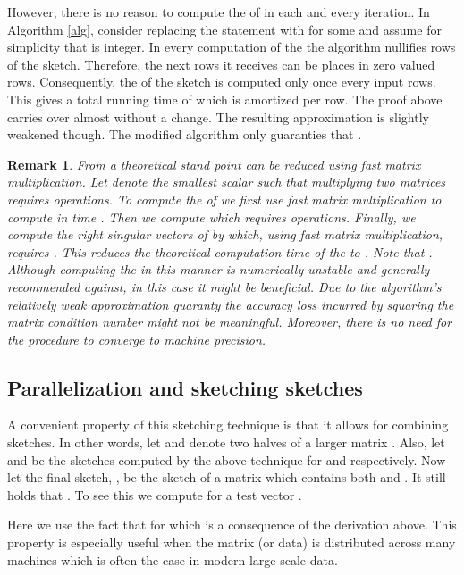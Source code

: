 \documentclass[]{article}
\newtheorem{remark}{Remark}
\begin{document}
However, there is no reason to compute the  of  in each and every iteration.
In Algorithm \ref{alg}, consider replacing the statement 
 with 
for some  and assume for simplicity that  is integer.
In every computation of the  the algorithm nullifies  rows of the sketch.
Therefore, the next  rows it receives can be places in zero valued rows.
Consequently, the  of the sketch is computed only once every  input rows.
This gives a total running time of  which is amortized  per row.
The proof above carries over almost without a change. The resulting approximation is slightly weakened though.
The modified algorithm only guaranties that .


\begin{remark}
From a theoretical stand point  can be reduced using fast matrix multiplication.
Let  denote the smallest scalar such that multiplying two  matrices requires  operations.
To compute the  of  we first use fast matrix multiplication to compute  in time .
Then we compute  which requires  operations.
Finally, we compute the right singular vectors of  by  which, using fast matrix multiplication, requires . This reduces the theoretical computation time of the  to . 
Note that  \cite{CohnKSU05}.
Although computing the  in this manner is numerically unstable and generally recommended against, 
in this case it might be beneficial.
Due to the algorithm's relatively weak approximation guaranty the accuracy loss incurred by squaring the matrix condition number might not be meaningful.
Moreover, there is no need for the  procedure to converge to machine precision. 

\end{remark}

\subsection{Parallelization and sketching sketches}
A convenient property of this sketching technique is that it allows for combining sketches.
In other words, let  and  denote two halves of a larger matrix . 
Also, let  and  be the sketches computed by the above technique for  and  respectively.
Now let the final sketch, , be the sketch of a matrix   which contains both  and .
It still holds that .
To see this we compute  for a test vector .

Here we use the fact that  for  which is a consequence of the derivation above.
This property is especially useful when the matrix (or data) is distributed across many machines which is often the case in modern large scale data.
\end{document}
